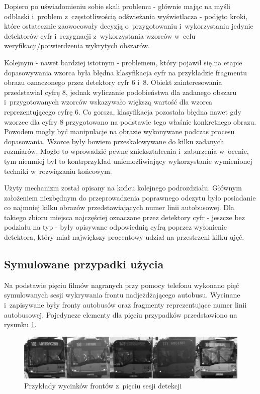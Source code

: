 Dopiero po uświadomieniu sobie 
skali problemu - głównie mając na myśli odblaski 
i~problem z~częstotliwością odświeżania wyświetlacza - podjęto
kroki, które ostatecznie zaowocowały decyzją
o~przygotowaniu i~wykorzystaniu jedynie detektorów cyfr
i~rezygnacji z~wykorzystania wzorców w~celu weryfikacji/potwierdzenia
wykrytych obszarów. 

Kolejnym - nawet bardziej istotnym - 
problemem, który pojawił się na etapie dopasowywania wzorca
była błędna klasyfikacja cyfr na przykładzie fragmentu obrazu oznaczonego
przez detektory cyfr 6 i~8.
Obiekt zainteresowania przedstawiał cyfrę 8, jednak 
wyliczanie podobieństwa dla zadanego
obszaru i~przygotowanych wzorców wskazywało większą wartość dla
wzorca reprezentującego cyfrę 6. 
Co gorsza, klasyfikacja pozostała błędna nawet gdy wzorzec dla cyfry 8 przygotowano na podstawie tego właśnie konkretnego obrazu.
Powodem mogły być manipulacje na obrazie wykonywane podczas procesu dopasowania.
Wzorce były bowiem przeskalowywane do kilku zadanych rozmiarów. Mogło to wprowadzić pewne zniekształcenia i~zaburzenia w~ocenie, tym niemniej
był to kontrprzykład uniemożliwiający wykorzystanie wymienionej techniki w~rozwiązaniu
końcowym. 

Użyty mechanizm został opisany na końcu kolejnego podrozdziału. Głównym założeniem
niezbędnym do przeprowadzenia poprawnego odczytu było posiadanie co najmniej kilku
obrazów przedstawiających numer linii autobusowej. Dla takiego zbioru
miejsca najczęściej oznaczane przez detektory cyfr - jeszcze bez podziału na typ -
były opisywane odpowiednią cyfrą poprzez wyłonienie detektora, który miał największy 
procentowy udział na przestrzeni kilku ujęć. 

\subsection{Symulowane przypadki użycia}

Na podstawie pięciu filmów nagranych przy pomocy telefonu wykonano pięć
symulowanych sesji wykrywania frontu nadjeżdżającego autobusu.
Wycinane i~zapisywane były fronty autobusów oraz fragmenty
reprezentujące numer linii autobusowej. Pojedyncze 
elementy dla pięciu przypadków przedstawiono 
na rysunku \ref{fig:5usecasesOverall}.

\begin{figure}[!h]
	\centering
	\includegraphics[width=1.01\textwidth]{img/5sessions/overall}
	\caption{Przykłady wycinków frontów z~pięciu sesji detekcji}
	\label{fig:5usecasesOverall}
\end{figure}

